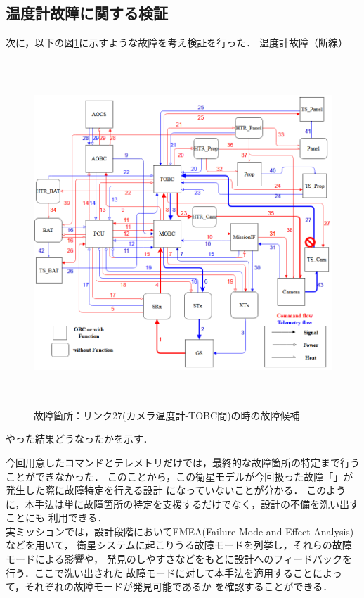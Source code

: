 \documentclass[11pt]{jsreport}
\begin{document}
\subsection{温度計故障に関する検証}%
次に，以下の図\ref{fig:fault_mode2}に示すような故障を考え検証を行った．
温度計故障（断線）
\begin{figure}[H]
   \centering
      \includegraphics[height=13.0cm]{figure/fault_mode2.png}
      \caption{故障箇所：リンク27(カメラ温度計-TOBC間)の時の故障候補}
      \label{fig:fault_mode2}
\end{figure}
やった結果どうなったかを示す．





今回用意したコマンドとテレメトリだけでは，最終的な故障箇所の特定まで行うことができなかった．
このことから，この衛星モデルが今回扱った故障「」が発生した際に故障特定を行える設計
になっていないことが分かる．
このように，本手法は単に故障箇所の特定を支援するだけでなく，設計の不備を洗い出すことにも
利用できる．\\
実ミッションでは，設計段階においてFMEA(Failure Mode and Effect Analysis)などを用いて，
衛星システムに起こりうる故障モードを列挙し，それらの故障モードによる影響や，
発見のしやすさなどをもとに設計へのフィードバックを行う．ここで洗い出された
故障モードに対して本手法を適用することによって，それぞれの故障モードが発見可能であるか
を確認することができる．
\end{document}

